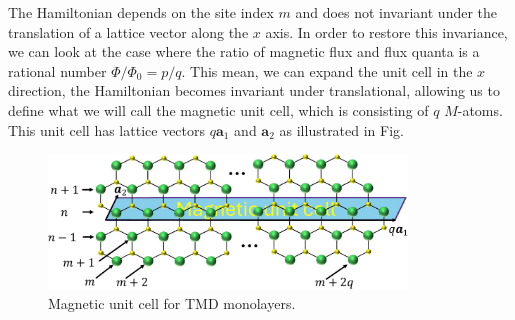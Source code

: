 \documentclass{report}
\begin{document}
The Hamiltonian depends on the site index $m$ and does not invariant under the translation of a lattice vector along the $x$ axis. In order to restore this invariance, we can look at the case where the ratio of magnetic flux and flux quanta is a rational number $\Phi / \Phi_{0} = p / q$. This mean, we can expand the unit cell in the $x$ direction, the Hamiltonian becomes invariant under translational, allowing us to define what we will call the magnetic unit cell, which is consisting of $q$ $M$-atoms. This unit cell has lattice vectors $q\mathbf{a}_{1}$ and $\mathbf{a}_{2}$ as illustrated in Fig.
\begin{figure}[H]
	\centering
	\includegraphics[width=0.85\textwidth,height=0.35\linewidth]{pic/magneticUC_cut.pdf}
	\caption{\label{fig:Mag UC} Magnetic unit cell for TMD monolayers.}
\end{figure}
\end{document}
